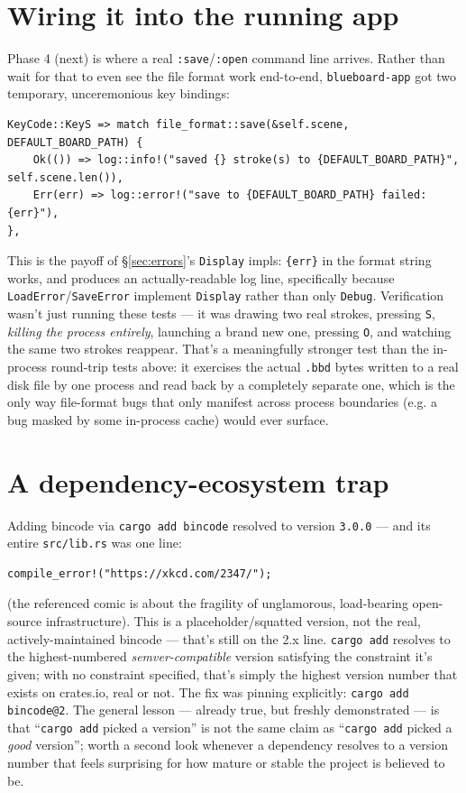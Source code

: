\documentclass[11pt]{article}
\begin{document}
\section{Wiring it into the running app}
\label{sec:verification}
Phase 4 (next) is where a real \texttt{:save}/\texttt{:open} command line arrives. Rather
than wait for that to even see the file format work end-to-end, \texttt{blueboard-app}
got two temporary, unceremonious key bindings:
\begin{lstlisting}
KeyCode::KeyS => match file_format::save(&self.scene, DEFAULT_BOARD_PATH) {
    Ok(()) => log::info!("saved {} stroke(s) to {DEFAULT_BOARD_PATH}", self.scene.len()),
    Err(err) => log::error!("save to {DEFAULT_BOARD_PATH} failed: {err}"),
},
\end{lstlisting}
This is the payoff of \S\ref{sec:errors}'s \texttt{Display} impls: \texttt{\{err\}} in the
format string works, and produces an actually-readable log line, specifically because
\texttt{LoadError}/\texttt{SaveError} implement \texttt{Display} rather than only
\texttt{Debug}. Verification wasn't just running these tests — it was drawing two real
strokes, pressing \texttt{S}, \emph{killing the process entirely}, launching a brand new
one, pressing \texttt{O}, and watching the same two strokes reappear. That's a meaningfully
stronger test than the in-process round-trip tests above: it exercises the actual
\texttt{.bbd} bytes written to a real disk file by one process and read back by a
completely separate one, which is the only way file-format bugs that only manifest
across process boundaries (e.g. a bug masked by some in-process cache) would ever surface.

\section{A dependency-ecosystem trap}
Adding bincode via \texttt{cargo add bincode} resolved to version \texttt{3.0.0} — and its
entire \texttt{src/lib.rs} was one line:
\begin{lstlisting}
compile_error!("https://xkcd.com/2347/");
\end{lstlisting}
(the referenced comic is about the fragility of unglamorous, load-bearing open-source
infrastructure). This is a placeholder/squatted version, not the real, actively-maintained
bincode — that's still on the 2.x line. \texttt{cargo add} resolves to the
highest-numbered \emph{semver-compatible} version satisfying the constraint it's given;
with no constraint specified, that's simply the highest version number that exists on
crates.io, real or not. The fix was pinning explicitly: \texttt{cargo add bincode@2}. The
general lesson — already true, but freshly demonstrated — is that ``\texttt{cargo add}
picked a version'' is not the same claim as ``\texttt{cargo add} picked a \emph{good}
version''; worth a second look whenever a dependency resolves to a version number that
feels surprising for how mature or stable the project is believed to be.
\end{document}
